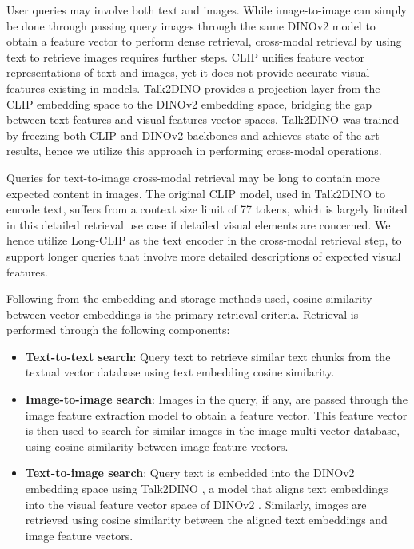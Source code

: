 User queries may involve both text and images.
While image-to-image can simply be done through passing query images through the same DINOv2 model to obtain a feature vector to perform dense retrieval,
cross-modal retrieval by using text to retrieve images requires further steps.
CLIP \cite{radford2021learningtransferablevisualmodels} unifies feature vector representations of text and images,
yet it does not provide accurate visual features existing in models.
Talk2DINO \cite{Barsellotti_2025_ICCV} provides a projection layer from the CLIP embedding space to the DINOv2 embedding space,
bridging the gap between text features and visual features vector spaces.
Talk2DINO was trained by freezing both CLIP and DINOv2 backbones and achieves state-of-the-art results, 
hence we utilize this approach in performing cross-modal operations.

Queries for text-to-image cross-modal retrieval may be long to contain more expected content in images.
The original CLIP model, used in Talk2DINO to encode text, suffers from a context size limit of 77 tokens, 
which is largely limited in this detailed retrieval use case if detailed visual elements are concerned.
We hence utilize Long-CLIP \cite{10.1007/978-3-031-72983-6_18} as the text encoder in the cross-modal retrieval step,
to support longer queries that involve more detailed descriptions of expected visual features.

Following from the embedding and storage methods used, cosine similarity between vector embeddings is the primary retrieval criteria. 
Retrieval is performed through the following components: 

\begin{itemize}
    \item \textbf{Text-to-text search}: 
        Query text to retrieve similar text chunks from the textual vector database using text embedding cosine similarity.
    \item \textbf{Image-to-image search}: 
        Images in the query, if any, are passed through the image feature extraction model to obtain a feature vector.
        This feature vector is then used to search for similar images in the image multi-vector database, using cosine similarity between image feature vectors.
    \item \textbf{Text-to-image search}: 
        Query text is embedded into the DINOv2 embedding space using Talk2DINO \cite{Barsellotti_2025_ICCV}, 
        a model that aligns text embeddings into the visual feature vector space of DINOv2 \cite{oquab2024dinov2learningrobustvisual}. 
        Similarly, images are retrieved using cosine similarity between the aligned text embeddings and image feature vectors.  
\end{itemize}

